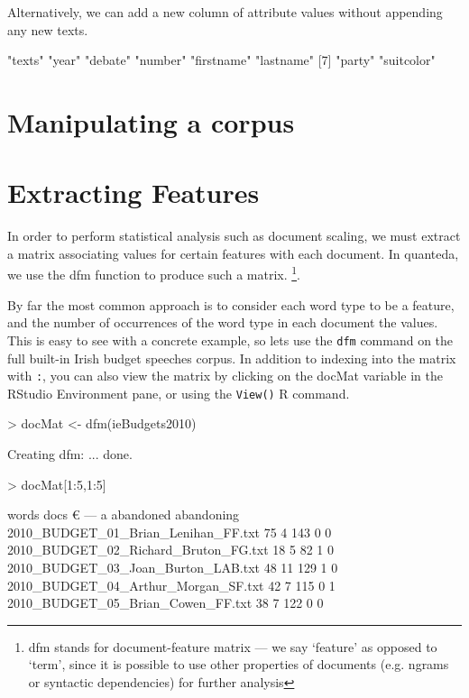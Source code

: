 \documentclass[11pt]{article}
\begin{document}
Alternatively, we can add a new column of attribute values without appending any new texts.
\begin{Schunk}
\begin{Soutput}
[1] "texts"     "year"      "debate"    "number"    "firstname" "lastname" 
[7] "party"     "suitcolor"
\end{Soutput}
\end{Schunk}


\section{Manipulating a corpus}


\section{Extracting Features}

In order to perform statistical analysis such as document scaling, we must extract a matrix associating values for certain features with each document. In quanteda, we use the dfm function to produce such a matrix. \footnote{dfm stands for document-feature matrix --- we say `feature' as opposed to `term', since it is possible to use other properties of documents (e.g. ngrams or syntactic dependencies) for further analysis}. 

By far the most common approach is to consider each word type to be a feature, and the number of occurrences of the word type in each document the values. This is easy to see with a concrete example, so lets use the \texttt{dfm} command on the full built-in Irish budget speeches corpus. In addition to indexing into the matrix with \texttt{:}, you can also view the matrix by clicking on the docMat variable in the RStudio Environment pane, or using the \texttt{View()} R command.


\begin{Schunk}
\begin{Sinput}
> docMat <- dfm(ieBudgets2010)
\end{Sinput}
\begin{Soutput}
Creating dfm: ... done. 
\end{Soutput}
\begin{Sinput}
> docMat[1:5,1:5]
\end{Sinput}
\begin{Soutput}
                                      words
docs                                    €  —   a abandoned abandoning
  2010_BUDGET_01_Brian_Lenihan_FF.txt  75  4 143         0          0
  2010_BUDGET_02_Richard_Bruton_FG.txt 18  5  82         1          0
  2010_BUDGET_03_Joan_Burton_LAB.txt   48 11 129         1          0
  2010_BUDGET_04_Arthur_Morgan_SF.txt  42  7 115         0          1
  2010_BUDGET_05_Brian_Cowen_FF.txt    38  7 122         0          0
\end{Soutput}
\end{Schunk}
\end{document}
